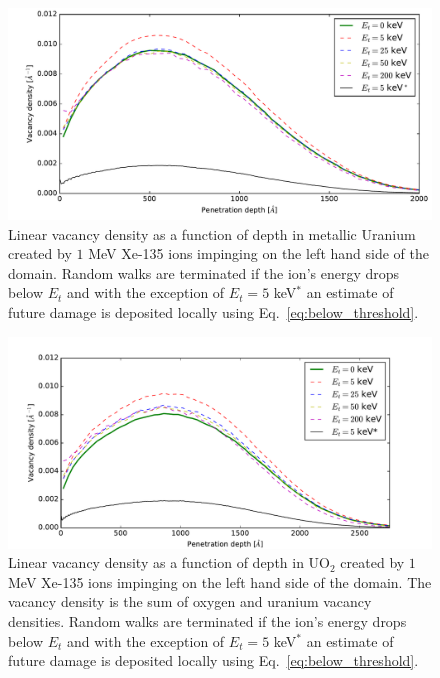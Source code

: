 \documentclass[letterpaper]{mandc2019}
\begin{document}
\begin{figure}[th]
	\centering
	\includegraphics[width=0.9\linewidth]{figures/metal_U.pdf}
	\caption{Linear vacancy density as a function of depth in metallic Uranium created by $1$ MeV Xe-135 ions impinging on the left hand side of the domain. Random walks are terminated if the ion's energy drops below $E_t$ and with the exception of $E_t = 5$ keV$^*$ an estimate of future damage is deposited locally using Eq.~\ref{eq:below_threshold}. \label{fig:metal_U}}
\end{figure}

\begin{figure}[th]
	\centering
	\includegraphics[width=0.9\linewidth]{figures/UO2.pdf}
	\caption{Linear vacancy density as a function of depth in UO$_2$ created by $1$ MeV Xe-135 ions impinging on the left hand side of the domain. The vacancy density is the sum of oxygen and uranium vacancy densities. Random walks are terminated if the ion's energy drops below $E_t$ and with the exception of $E_t = 5$ keV$^*$ an estimate of future damage is deposited locally using Eq.~\ref{eq:below_threshold}.\label{fig:UO2}}
\end{figure}
\end{document}
